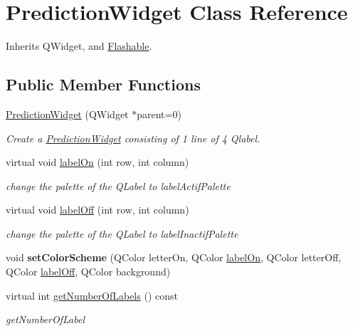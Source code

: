 \hypertarget{class_prediction_widget}{\section{Prediction\-Widget Class Reference}
\label{class_prediction_widget}
}


Inherits Q\-Widget, and \hyperlink{class_flashable}{Flashable}.

\subsection*{Public Member Functions}
\begin{DoxyCompactItemize}
\item 
\hyperlink{class_prediction_widget_aca8be6dfb321e65e094768ae5bd98eea}{Prediction\-Widget} (Q\-Widget $\ast$parent=0)
\begin{DoxyCompactList}\small\item\em Create a \hyperlink{class_prediction_widget}{Prediction\-Widget} consisting of 1 line of 4 Qlabel. \end{DoxyCompactList}\item 
virtual void \hyperlink{class_prediction_widget_adfd7a001533172e8181baae1293f66dd}{label\-On} (int row, int column)
\begin{DoxyCompactList}\small\item\em change the palette of the Q\-Label to label\-Actif\-Palette \end{DoxyCompactList}\item 
virtual void \hyperlink{class_prediction_widget_ade86254c37ebd0adb73a7356fd29800c}{label\-Off} (int row, int column)
\begin{DoxyCompactList}\small\item\em change the palette of the Q\-Label to label\-Inactif\-Palette \end{DoxyCompactList}\item 
\hypertarget{class_prediction_widget_afeb8cd3f247792064a7a09a8b8458b13}{void {\bfseries set\-Color\-Scheme} (Q\-Color letter\-On, Q\-Color \hyperlink{class_prediction_widget_adfd7a001533172e8181baae1293f66dd}{label\-On}, Q\-Color letter\-Off, Q\-Color \hyperlink{class_prediction_widget_ade86254c37ebd0adb73a7356fd29800c}{label\-Off}, Q\-Color background)}\label{class_prediction_widget_afeb8cd3f247792064a7a09a8b8458b13}

\item 
virtual int \hyperlink{class_prediction_widget_ae0910905fae78ac2512858b828a3e5a1}{get\-Number\-Of\-Labels} () const 
\begin{DoxyCompactList}\small\item\em get\-Number\-Of\-Label \end{DoxyCompactList}\end{DoxyCompactItemize}
